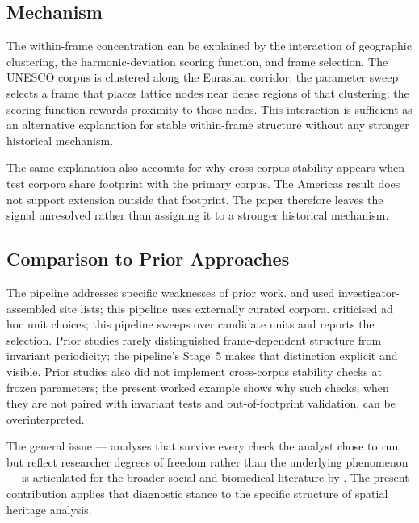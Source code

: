 \documentclass[12pt,a4paper]{article}
\begin{document}
\subsection{Mechanism}

The within-frame concentration can be explained by the interaction of
geographic clustering, the harmonic-deviation scoring function, and
frame selection. The UNESCO corpus is clustered along the Eurasian
corridor; the parameter sweep selects a frame that places lattice
nodes near dense regions of that clustering; the scoring function
rewards proximity to those nodes. This interaction is sufficient as an
alternative explanation for stable within-frame structure without any
stronger historical mechanism.

The same explanation also accounts for why cross-corpus stability
appears when test corpora share footprint with the primary corpus. The
Americas result does not support extension outside that footprint. The
paper therefore leaves the signal unresolved rather than assigning it
to a stronger historical mechanism.

\subsection{Comparison to Prior Approaches}

The pipeline addresses specific weaknesses of prior work.
\citet{thom1967} and \citet{kendall1974} used investigator-assembled
site lists; this pipeline uses externally curated corpora.
\citet{freeman1976} criticised ad hoc unit choices; this pipeline
sweeps over candidate units and reports the selection. Prior studies
rarely distinguished frame-dependent structure from invariant
periodicity; the pipeline's Stage~5 makes that distinction explicit
and visible. Prior studies also did not implement cross-corpus
stability checks at frozen parameters; the present worked example
shows why such checks, when they are not paired with invariant tests
and out-of-footprint validation, can be overinterpreted.

The general issue --- analyses that survive every check the analyst
chose to run, but reflect researcher degrees of freedom rather than
the underlying phenomenon --- is articulated for the broader social
and biomedical literature by \citet{gelmanloken2014}. The present
contribution applies that diagnostic stance to the specific structure
of spatial heritage analysis.

\end{document}
